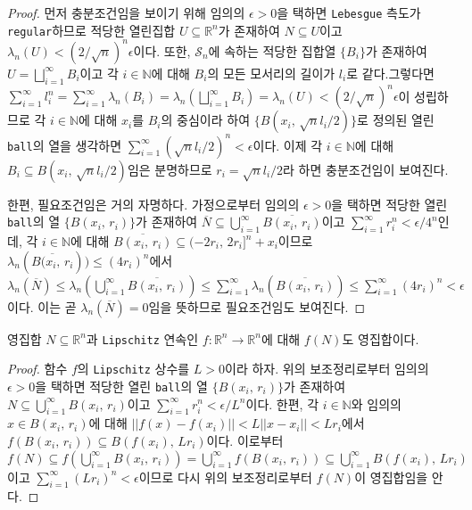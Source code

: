 \begin{proof}
    먼저 충분조건임을 보이기 위해 임의의 $\epsilon>0$을 택하면 \texttt{Lebesgue} 측도가 \texttt{regular}하므로 적당한 열린집합 $U\subseteq\mathbb{R}^n$가 존재하여 $N\subseteq U$이고 $\lambda_n(U)<(2/\sqrt{n})^n\epsilon$이다. 또한, $\mathcal{S}_n$에 속하는 적당한 집합열 $\{B_i\}$가 존재하여 $U=\bigsqcup_{i=1}^\infty B_i$이고 각 $i\in\mathbb{N}$에 대해 $B_i$의 모든 모서리의 길이가 $l_i$로 같다.\footnotemark 그렇다면 $\sum_{i=1}^\infty l_i^n=\sum_{i=1}^\infty\lambda_n(B_i)=\lambda_n(\bigsqcup_{i=1}^\infty B_i)=\lambda_n(U)<(2/\sqrt{n})^n\epsilon$이 성립하므로 각 $i\in\mathbb{N}$에 대해 $x_i$를 $B_i$의 중심이라 하여 $\{B(x_i,\,\sqrt{n}l_i/2)\}$로 정의된 열린 \texttt{ball}의 열을 생각하면 $\sum_{i=1}^\infty(\sqrt{n}l_i/2)^n<\epsilon$이다. 이제 각 $i\in\mathbb{N}$에 대해 $B_i\subseteq B(x_i,\,\sqrt{n}l_i/2)$임은 분명하므로 $r_i=\sqrt{n}l_i/2$라 하면 충분조건임이 보여진다.
    
    한편, 필요조건임은 거의 자명하다. 가정으로부터 임의의 $\epsilon>0$을 택하면 적당한 열린 \texttt{ball}의 열 $\{B(x_i,\,r_i)\}$가 존재하여 $\overline{N}\subseteq\bigcup_{i=1}^\infty\overline{B(x_i,\,r_i)}$이고 $\sum_{i=1}^\infty r_i^n<\epsilon/4^n$인데, 각 $i\in\mathbb{N}$에 대해 $\overline{B(x_i,\,r_i)}\subseteq(-2r_i,\,2r_i]^n+x_i$이므로 $\lambda_n(\overline{B(x_i,\,r_i}))\leq(4r_i)^n$에서 $\lambda_n(\overline{N})\leq\lambda_n(\bigcup_{i=1}^\infty\overline{B(x_i,\,r_i)})\leq\sum_{i=1}^\infty\lambda_n(\overline{B(x_i,\,r_i)})\leq\sum_{i=1}^\infty (4r_i)^n<\epsilon$이다. 이는 곧 $\lambda_n(\overline{N})=0$임을 뜻하므로 필요조건임도 보여진다.
\end{proof}

\begin{lemma}\label{lem:LipschitzNull}
    영집합 $N\subseteq\mathbb{R}^n$과 \texttt{Lipschitz} 연속인 $f:\mathbb{R}^n\to\mathbb{R}^n$에 대해 $f(N)$도 영집합이다.
\end{lemma}

\begin{proof}
    함수 $f$의 \texttt{Lipschitz} 상수를 $L>0$이라 하자. 위의 보조정리로부터 임의의 $\epsilon>0$을 택하면 적당한 열린 \texttt{ball}의 열 $\{B(x_i,\,r_i)\}$가 존재하여 $N\subseteq\bigcup_{i=1}^\infty B(x_i,\,r_i)$이고 $\sum_{i=1}^\infty r_i^n<\epsilon/L^n$이다. 한편, 각 $i\in\mathbb{N}$와 임의의 $x\in B(x_i,\,r_i)$에 대해 $||f(x)-f(x_i)||<L||x-x_i||<Lr_i$에서 $f(B(x_i,\,r_i))\subseteq B(f(x_i),\,Lr_i)$이다. 이로부터 $f(N)\subseteq f(\bigcup_{i=1}^\infty B(x_i,\,r_i))=\bigcup_{i=1}^\infty f(B(x_i,\,r_i))\subseteq\bigcup_{i=1}^\infty B(f(x_i),\,Lr_i)$이고 $\sum_{i=1}^\infty(Lr_i)^n<\epsilon$이므로 다시 위의 보조정리로부터 $f(N)$이 영집합임을 안다.
\end{proof}


